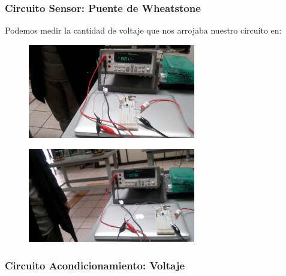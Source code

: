 \documentclass[12pt, fleqn]{article}                            %
\theoremstyle{break}                                            %
\begin{document}
        \subsubsection{Circuito Sensor: Puente de Wheatstone}

            Podemos medir la cantidad de voltaje que nos arrojaba nuestro circuito 
            en:
            \begin{figure}[h]
                \centering
                \includegraphics[width=0.65\textwidth]{PuenteDifererencia1}
            \end{figure}

            \begin{figure}[h]
                \centering
                \includegraphics[width=0.65\textwidth]{PuenteDifererencia2}
            \end{figure}



        \clearpage
        \subsubsection{Circuito Acondicionamiento: Voltaje}
\end{document}
